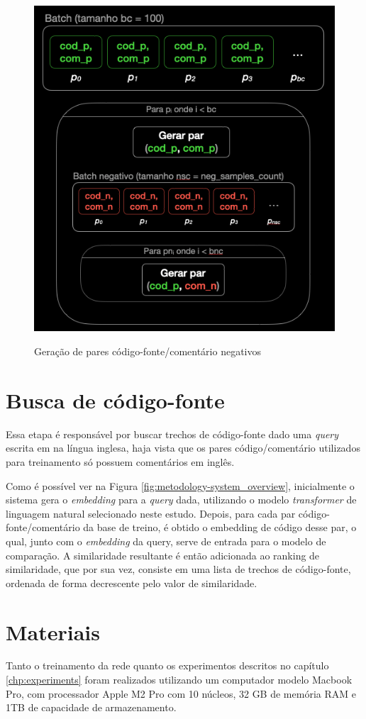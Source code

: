 \begin{figure}[H]
    \centering
        \caption{Geração de pares código-fonte/comentário negativos}
        \includegraphics[scale=0.7]{neg_samples_gen.png}
        \label{fig:metodology-neg_samples_gen_diagram}
\end{figure}

\section{Busca de código-fonte}
Essa etapa é responsável por buscar trechos de código-fonte dado uma \textit{query} escrita em na língua inglesa, haja vista que os pares código/comentário utilizados para treinamento só possuem comentários em inglês.

Como é possível ver na Figura \ref{fig:metodology-system_overview}, inicialmente o sistema gera o \textit{embedding} para a \textit{query} dada, utilizando o modelo \textit{transformer} de linguagem natural selecionado neste estudo. Depois, para cada par código-fonte/comentário da base de treino, é obtido o embedding de código desse par, o qual, junto com o \textit{embedding} da query, serve de entrada para o modelo de comparação. A similaridade resultante é então adicionada ao ranking de similaridade, que por sua vez, consiste em uma lista de trechos de código-fonte, ordenada de forma decrescente pelo valor de similaridade.

\section{Materiais}
Tanto o treinamento da rede quanto os experimentos descritos no capítulo \ref{chp:experiments} foram realizados utilizando um computador modelo Macbook Pro, com processador Apple M2 Pro com 10 núcleos, 32 GB de memória RAM e 1TB de capacidade de armazenamento.
